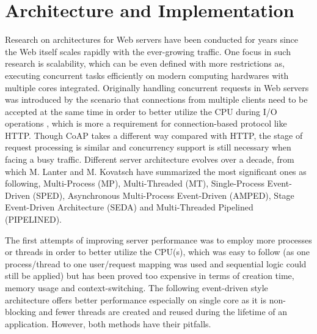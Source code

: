 \chapter{Architecture and Implementation}\label{ch4}

Research on architectures for Web servers have been conducted for years since the Web itself scales rapidly with the ever-growing traffic. One focus in such research is scalability, which can be even defined with more restrictions as, executing concurrent tasks efficiently on modern computing hardwares with multiple cores integrated. Originally handling concurrent requests in Web servers was introduced by the scenario that connections from multiple clients need to be accepted at the same time in order to better utilize the CPU during I/O operations \cite{kovatsch2015scalable}, which is more a requirement for connection-based protocol like HTTP. Though CoAP takes a different way compared with HTTP, the stage of request processing is similar and concurrency support is still necessary when facing a busy traffic. Different server architecture evolves over a decade, from which M. Lanter \cite{lanter2013scalability} and M. Kovatsch \cite{kovatsch2015scalable} have summarized the most significant ones as following, Multi-Process (MP), Multi-Threaded (MT), Single-Process Event-Driven (SPED), Asynchronous Multi-Process Event-Driven (AMPED), Stage Event-Driven Architecture (SEDA) and Multi-Threaded Pipelined (PIPELINED). 

The first attempts of improving server performance was to employ more processes or threads in order to better utilize the CPU(s), which was easy to follow (as one process/thread to one user/request mapping was used and sequential logic could still be applied) but has been proved too expensive in terms of creation time, memory usage and context-switching. The following event-driven style architecture offers better performance especially on single core as it is non-blocking and fewer threads are created and reused during the lifetime of an application. However, both methods have their pitfalls. 

